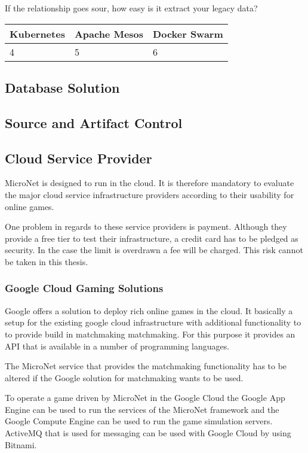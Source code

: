 If the relationship goes sour, how easy is it extract your legacy data?

\begin{center}
  \begin{tabular}{ | p{4.5cm} | p{4.5cm} | p{4.5cm} | }
    \hline
    \textbf{Kubernetes}&\textbf{Apache Mesos}&\textbf{Docker Swarm}\\\hline
    4 & 5 & 6 \\
    \hline
  \end{tabular}
\end{center}
 
\subsection{Database Solution}
\subsection{Source and Artifact Control}
\subsection{Cloud Service Provider}

MicroNet is designed to run in the cloud. It is therefore mandatory to evaluate
the major cloud service infrastructure providers according to their usability
for online games.

One problem in regards to these service providers is payment. Although they
provide a free tier to test their infrastructure, a credit card has to be
pledged as security. In the case the limit is overdrawn a fee will be charged.
This risk cannot be taken in this thesis. 

\subsubsection{Google Cloud Gaming Solutions}

Google offers a solution to deploy rich online games in the cloud. It basically
a setup for the existing google cloud infrastructure with additional
functionality to to provide build in matchmaking matchmaking. For this purpose
it provides an API that is available in a number of programming languages.

The MicroNet service that provides the matchmaking functionality has to be
altered if the Google solution for matchmaking wants to be used. 

To operate a game driven by MicroNet in the Google Cloud the Google App Engine
can be used to run the services of the MicroNet framework and the Google Compute
Engine can be used to run the game simulation servers. ActiveMQ that is used for
messaging can be used with Google Cloud by using Bitnami.

